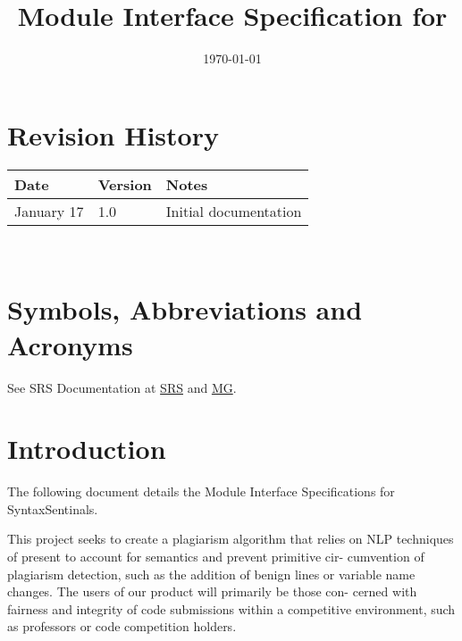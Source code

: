\documentclass[12pt, titlepage]{article}
\begin{document}
\title{Module Interface Specification for \progname{}}

\author{\authname}

\date{\today}

\maketitle


\section{Revision History}

\begin{tabularx}{\textwidth}{p{3cm}p{2cm}X}
\toprule {\bf Date} & {\bf Version} & {\bf Notes}\\
\midrule
January 17 & 1.0 & Initial documentation\\
\bottomrule
\end{tabularx}

~\newpage

\section{Symbols, Abbreviations and Acronyms}

See SRS Documentation at \href{https://github.com/SyntaxSentinels/SyntaxSentinels/blob/main/docs/SRS-Volere/SRS.pdf}{SRS} and \href{https://github.com/SyntaxSentinels/SyntaxSentinels/blob/main/docs/Design/SoftArchitecture/MG.pdf}{MG}.


\newpage

\tableofcontents

\newpage


\section{Introduction}

The following document details the Module Interface Specifications for SyntaxSentinals.

This project seeks to create a plagiarism algorithm that relies on NLP
techniques of present to account for semantics and prevent primitive cir-
cumvention of plagiarism detection, such as the addition of benign lines or
variable name changes. The users of our product will primarily be those con-
cerned with fairness and integrity of code submissions within a competitive
environment, such as professors or code competition holders.
\end{document}
